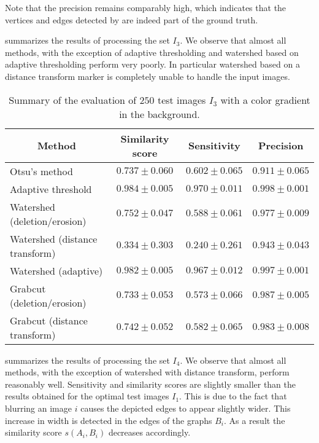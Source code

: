 		Note that the precision remains comparably high, which indicates that the vertices and edges detected by \NEFI are indeed part of the ground truth.

		 summarizes the results of processing the set $I_3$. We observe that almost all methods, with the exception of adaptive thresholding and watershed based on adaptive thresholding perform very poorly. In particular watershed based on a distance transform marker is completely unable to handle the input images.

		\begin{table}
			\centering
			\begin{tabular}{@{} l *3c @{}}
			\toprule
			\multicolumn{1}{c}{Method}    & Similarity score  & Sensitivity  & Precision \\ 
			\midrule
			Otsu's method                   & $0.737 \pm 0.060$ & $0.602 \pm 0.065$ & $0.911 \pm 0.065$ \\
			Adaptive threshold              & $0.984 \pm 0.005$ & $0.970 \pm 0.011$ & $0.998 \pm 0.001$ \\
			Watershed (deletion/erosion)    & $0.752 \pm 0.047$ & $0.588 \pm 0.061$ & $0.977 \pm 0.009$ \\
			Watershed (distance transform)  & $0.334 \pm 0.303$ & $0.240 \pm 0.261$ & $0.943 \pm 0.043$ \\
			Watershed (adaptive)            & $0.982 \pm 0.005$ & $0.967 \pm 0.012$ & $0.997 \pm 0.001$ \\
			Grabcut (deletion/erosion)      & $0.733 \pm 0.053$ & $0.573 \pm 0.066$ & $0.987 \pm 0.005$ \\
			Grabcut (distance transform)    & $0.742 \pm 0.052$ & $0.582 \pm 0.065$ & $0.983 \pm 0.008$ \\
			\bottomrule
			\end{tabular}
			\caption[\NEFIs evaluation: Images with background color gradient]{Summary of the evaluation of $250$ test images $I_3$ with a color gradient in the background.}
			\label{tab:background_gradient}
		\end{table}

		 summarizes the results of processing the set $I_4$. We observe that almost all methods, with the exception of watershed with distance transform, perform reasonably well. Sensitivity and similarity scores are slightly smaller than the results obtained for the optimal test images $I_1$. This is due to the fact that blurring an image $i$ causes the depicted edges to appear slightly wider. This increase in width is detected in the edges of the graphs $B_i$. As a result the similarity score $s(A_i,B_i)$ decreases accordingly.

